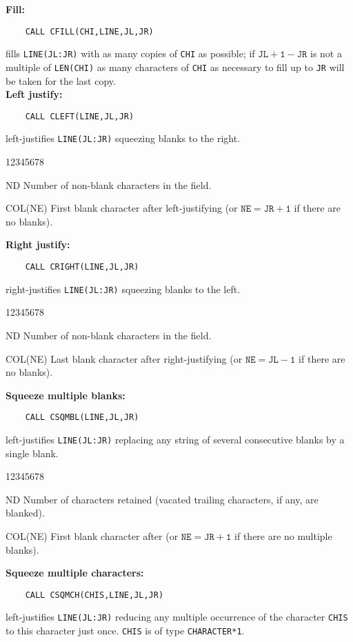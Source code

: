 {\bf Fill:}
\begin{verbatim}
    CALL CFILL(CHI,LINE,JL,JR)
\end{verbatim}
fills {\tt LINE(JL:JR)} with as many copies of {\tt CHI} as possible;
if $\mathtt{JL+1-JR}$ is not a multiple of {\tt LEN(CHI)} as many
characters of {\tt CHI} as necessary to fill up to {\tt JR} will be
taken for the last copy. \\[2mm]
{\bf Left justify:}
\begin{verbatim}
    CALL CLEFT(LINE,JL,JR)
\end{verbatim}
left-justifies {\tt LINE(JL:JR)} squeezing blanks to the right.
\begin{DLtt}{12345678}
\item [ND] Number of non-blank characters in the field.
\item[COL(NE)] First blank character after left-justifying
(or $\mathtt{NE=JR+1}$ if there are no blanks).
\end{DLtt}
{\bf Right justify:}
\begin{verbatim}
    CALL CRIGHT(LINE,JL,JR)
\end{verbatim}
 right-justifies {\tt LINE(JL:JR)} squeezing blanks to the left.
\begin{DLtt}{12345678}
\item [ND] Number of non-blank characters in the field.
\item[COL(NE)] Last blank character after right-justifying
(or $\mathtt{NE=JL-1}$ if there are no blanks).
\end{DLtt}
\newpage
{\bf Squeeze multiple blanks:}
\begin{verbatim}
    CALL CSQMBL(LINE,JL,JR)
\end{verbatim}
left-justifies {\tt LINE(JL:JR)} replacing any string of several
consecutive blanks by a single blank.
\begin{DLtt}{12345678}
\item[ND] Number of characters retained (vacated trailing characters,
if any, are blanked).
\item[COL(NE)] First blank character after (or $\mathtt{NE=JR+1}$ if
there are no multiple blanks).
\end{DLtt}
{\bf Squeeze multiple characters:}
\begin{verbatim}
    CALL CSQMCH(CHIS,LINE,JL,JR)
\end{verbatim}
left-justifies {\tt LINE(JL:JR)} reducing any multiple occurrence
of the character {\tt CHIS} to this character just once.
{\tt CHIS} is of type {\tt CHARACTER*1}.
